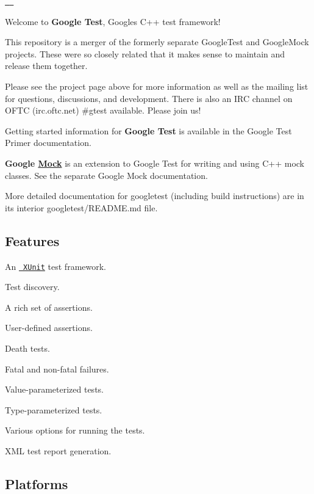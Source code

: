 \href{https://travis-ci.org/google/googletest}\texttt{ } \href{https://ci.appveyor.com/project/BillyDonahue/googletest/branch/master}\texttt{ }

Welcome to {\bfseries{Google Test}}, Google\textquotesingle{}s C++ test framework!

This repository is a merger of the formerly separate Google\+Test and Google\+Mock projects. These were so closely related that it makes sense to maintain and release them together.

Please see the project page above for more information as well as the mailing list for questions, discussions, and development. There is also an I\+RC channel on O\+F\+TC (irc.\+oftc.\+net) \#gtest available. Please join us!

Getting started information for {\bfseries{Google Test}} is available in the Google Test Primer documentation.

{\bfseries{Google \mbox{\hyperlink{class_mock}{Mock}}}} is an extension to Google Test for writing and using C++ mock classes. See the separate Google Mock documentation.

More detailed documentation for googletest (including build instructions) are in its interior googletest/\+R\+E\+A\+D\+ME.md file.

\subsection*{Features}


\begin{DoxyItemize}
\item An \href{https://en.wikipedia.org/wiki/XUnit}\texttt{ X\+Unit} test framework.
\item Test discovery.
\item A rich set of assertions.
\item User-\/defined assertions.
\item Death tests.
\item Fatal and non-\/fatal failures.
\item Value-\/parameterized tests.
\item Type-\/parameterized tests.
\item Various options for running the tests.
\item X\+ML test report generation.
\end{DoxyItemize}

\subsection*{Platforms}

